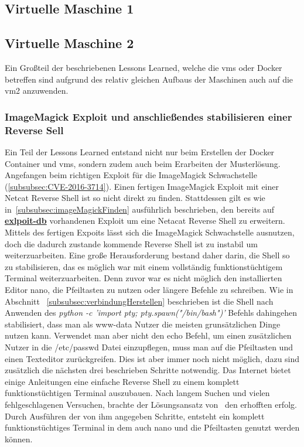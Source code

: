 \documentclass[10pt, a4paper,onecolumn ,titlepage]{article}
\begin{document}
    \subsection{Virtuelle Maschine 1}
    \label{subsec:vm1lessonslearned}

    \subsection{Virtuelle Maschine 2}
    \label{subsec:vm2LessonsLearned}
    Ein Großteil der beschriebenen Lessons Learned, welche die \ac{vm}s oder Docker betreffen sind aufgrund des relativ gleichen Aufbaus der Maschinen auch auf die \ac{vm}2 anzuwenden.

    \subsubsection{ImageMagick Exploit und anschließendes stabilisieren einer Reverse Sell}
    \label{subsubsec:lessonslearnedShell}
    Ein Teil der Lessons Learned entstand nicht nur beim Erstellen der Docker Container und \ac{vm}s, sondern zudem auch beim Erarbeiten der Musterlösung.
    Angefangen beim richtigen Exploit für die ImageMagick Schwachstelle (\ref{subsubsec:CVE-2016-3714}).
    Einen fertigen ImageMagick Exploit mit einer Netcat Reverse Shell ist so nicht direkt zu finden.
    Stattdessen gilt es wie in~\ref{subsubsec:imageMagickFinden} ausführlich beschrieben, den bereits auf \href{https://www.exploit-db.com/exploits/39767}{\textbf{exlpoit-db}} vorhandenen Exploit um eine Netacat Reverse Shell zu erweitern.
    Mittels des fertigen Expoits lässt sich die ImageMagick Schwachstelle ausnutzen, doch die dadurch zustande kommende Reverse Shell ist zu instabil um weiterzuarbeiten.
    Eine große Herausforderung bestand daher darin, die Shell so zu stabilisieren, das es möglich war mit einem vollständig funktionstüchtigem Terminal weiterzuarbeiten.
    Denn zuvor war es nicht möglich den installierten Editor nano, die Pfeiltasten zu nutzen oder längere Befehle zu schreiben.
    Wie in Abschnitt ~\ref{subsubsec:verbindungHerstellen} beschrieben ist die Shell nach Anwenden des \textit{python -c 'import pty; pty.spawn("/bin/bash")'} Befehls dahingehen stabilisiert, dass man als www-data Nutzer die meisten grunsätzlichen Dinge nutzen kann.
    Verwendet man aber nicht den echo Befehl, um einen zusätzlichen Nutzer in die /etc/passwd Datei einzupflegen, muss man auf die Pfeiltasten und einen Texteditor zurückgreifen.
    Dies ist aber immer noch nicht möglich, dazu sind zusätzlich die nächsten drei beschrieben Schritte notwendig.
    Das Internet bietet einige Anleitungen eine einfache Reverse Shell zu einem komplett funktionstüchtigen Terminal auszubauen.
    Nach langem Suchen und vielen fehlgeschlagenen Versuchen, brachte der Lösungsansatz von~\textcite{shellStabilisieren} den erhofften erfolg.
    Durch Ausführen der von ihm angegeben Schritte, entsteht ein komplett funktionstüchtiges Terminal in dem auch nano und die Pfeiltasten genutzt werden können.
\end{document}
